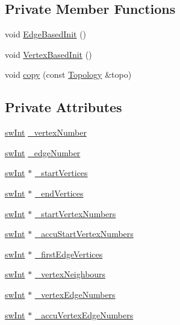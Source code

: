 \subsection*{Private Member Functions}
\begin{DoxyCompactItemize}
\item 
void \hyperlink{classTopology_ad6fc372c14f66f783e82b232ed19f490}{EdgeBasedInit} ()
\item 
void \hyperlink{classTopology_ac5b0af485327b4a3bb924ebbc1687f3b}{VertexBasedInit} ()
\item 
void \hyperlink{classTopology_a67e65a4845822ce3283fca569479f2aa}{copy} (const \hyperlink{classTopology}{Topology} \&topo)
\end{DoxyCompactItemize}
\subsection*{Private Attributes}
\begin{DoxyCompactItemize}
\item 
\hyperlink{swMacro_8h_a113cf5f6b5377cdf3fac6aa4e443e9aa}{swInt} \hyperlink{classTopology_a622029bc7be2f3f9cbcbd47530062c2a}{\_\-vertexNumber}
\item 
\hyperlink{swMacro_8h_a113cf5f6b5377cdf3fac6aa4e443e9aa}{swInt} \hyperlink{classTopology_a23fdfaed6869d854a45a179bab71149d}{\_\-edgeNumber}
\item 
\hyperlink{swMacro_8h_a113cf5f6b5377cdf3fac6aa4e443e9aa}{swInt} $\ast$ \hyperlink{classTopology_ae24916cab2e48d159e5894ee381fa044}{\_\-startVertices}
\item 
\hyperlink{swMacro_8h_a113cf5f6b5377cdf3fac6aa4e443e9aa}{swInt} $\ast$ \hyperlink{classTopology_a511853b9823e76e44a3dc018f22d6693}{\_\-endVertices}
\item 
\hyperlink{swMacro_8h_a113cf5f6b5377cdf3fac6aa4e443e9aa}{swInt} $\ast$ \hyperlink{classTopology_afe66f14272fa860fcd947053fec0f5fa}{\_\-startVertexNumbers}
\item 
\hyperlink{swMacro_8h_a113cf5f6b5377cdf3fac6aa4e443e9aa}{swInt} $\ast$ \hyperlink{classTopology_a46bf4262d784a61a1742e75e116d133f}{\_\-accuStartVertexNumbers}
\item 
\hyperlink{swMacro_8h_a113cf5f6b5377cdf3fac6aa4e443e9aa}{swInt} $\ast$ \hyperlink{classTopology_a64f2be86b47d7aa94e44a4e7f86b6fb0}{\_\-firstEdgeVertices}
\item 
\hyperlink{swMacro_8h_a113cf5f6b5377cdf3fac6aa4e443e9aa}{swInt} $\ast$ \hyperlink{classTopology_ad8a74f2e5d075ae25040947b64e46c77}{\_\-vertexNeighbours}
\item 
\hyperlink{swMacro_8h_a113cf5f6b5377cdf3fac6aa4e443e9aa}{swInt} $\ast$ \hyperlink{classTopology_a1ed0547c308694b98362a06af38cc985}{\_\-vertexEdgeNumbers}
\item 
\hyperlink{swMacro_8h_a113cf5f6b5377cdf3fac6aa4e443e9aa}{swInt} $\ast$ \hyperlink{classTopology_a751c468a38bfd6ffe115cb85698dc8e0}{\_\-accuVertexEdgeNumbers}
\end{DoxyCompactItemize}


